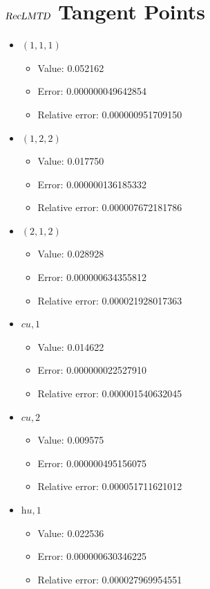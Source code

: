\documentclass{article}%
\begin{document}
\section{$\textsl{RecLMTD}$ Tangent Points}%
\thispagestyle{plain}%
\begin{itemize}%
	\item $(1, 1, 1)$%
	\begin{itemize}%
		\item Value: 0.052162%
		\item Error: 0.000000049642854%
		\item Relative error: 0.000000951709150%
	\end{itemize}%
	\item $(1, 2, 2)$%
	\begin{itemize}%
		\item Value: 0.017750%
		\item Error: 0.000000136185332%
		\item Relative error: 0.000007672181786%
	\end{itemize}%
	\item $(2, 1, 2)$%
	\begin{itemize}%
		\item Value: 0.028928%
		\item Error: 0.000000634355812%
		\item Relative error: 0.000021928017363%
	\end{itemize}%
	\item $\textit{cu},1$%
	\begin{itemize}%
		\item Value: 0.014622%
		\item Error: 0.000000022527910%
		\item Relative error: 0.000001540632045%
	\end{itemize}%
	\item $\textit{cu},2$%
	\begin{itemize}%
		\item Value: 0.009575%
		\item Error: 0.000000495156075%
		\item Relative error: 0.000051711621012%
	\end{itemize}%
	\item $\textit{hu},1$%
	\begin{itemize}%
		\item Value: 0.022536%
		\item Error: 0.000000630346225%
		\item Relative error: 0.000027969954551%
	\end{itemize}%
\end{itemize}%
\end{document}
